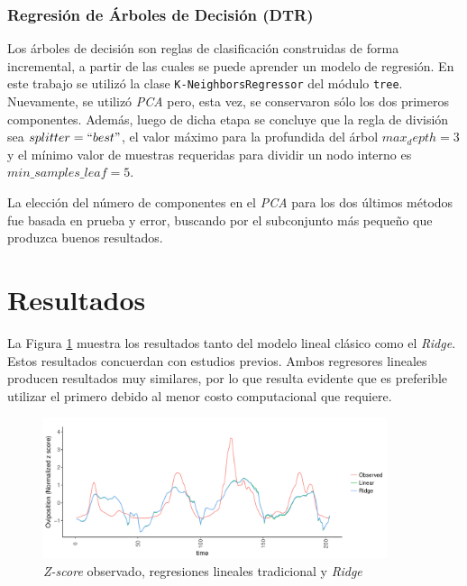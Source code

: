     \subsubsection{Regresión de Árboles de Decisión (DTR)}
      \par Los árboles de decisión son reglas de clasificación construidas de
      forma incremental, a partir de las cuales se puede aprender un modelo
      de regresión. En este trabajo se utilizó la clase \verb|K-NeighborsRegressor|
      del módulo \verb|tree|. Nuevamente, se utilizó \textit{PCA} pero, esta
      vez, se conservaron sólo los dos primeros componentes. Además, luego de
      dicha etapa se concluye que la regla de división sea $splitter = ``best"$,
      el valor máximo para la profundida del árbol $max_depth = 3$ y el mínimo
      valor de muestras requeridas para dividir un nodo interno es
      $min\_samples\_leaf = 5$.

      \par La elección del número de componentes en el \textit{PCA} para los
      dos últimos métodos fue basada en prueba y error, buscando por el
      subconjunto más pequeño que produzca buenos resultados.


  \section{Resultados}

    \par La Figura \ref{fig:ridge_vs_time} muestra los resultados tanto del
      modelo lineal clásico como el \textit{Ridge}. Estos resultados concuerdan
      con estudios previos. Ambos regresores lineales producen resultados muy
      similares, por lo que resulta evidente que es preferible utilizar el
      primero debido al menor costo computacional que requiere.
      \begin{figure}[hbt]
      \centering%
      \includegraphics[width=0.9\textwidth]{images/RidgeVsTime}%
      \caption{\textit{Z-score} observado, regresiones lineales tradicional y
               \textit{Ridge}}\label{fig:ridge_vs_time}
      \end{figure}

